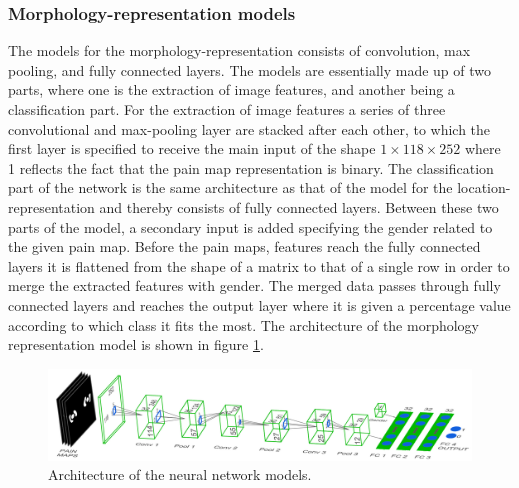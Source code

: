 


\subsubsection{Morphology-representation models}
The models for the morphology-representation consists of convolution, max pooling, and fully connected layers. 
The models are essentially made up of two parts, where one is the extraction of image features, and another being a classification part.
For the extraction of image features a series of three convolutional and max-pooling layer are stacked after each other, to which the first layer is specified to receive the main input of the shape $1 \times 118 \times 252$ where 1 reflects the fact that the pain map representation is binary.
The classification part of the network is the same architecture as that of the model for the location-representation and thereby consists of fully connected layers. Between these two parts of the model, a secondary input is added specifying the gender related to the given pain map.
Before the pain maps, features reach the fully connected layers it is flattened from the shape of a matrix to that of a single row in order to merge the extracted features with gender. The merged data passes through fully connected layers and reaches the output layer where it is given a percentage value according to which class it fits the most.
The architecture of the morphology representation model is shown in figure \ref{fig:Schema1}.

\begin{figure} [H]
\centering
\includegraphics[width=1.0\textwidth]{figures/models}
\caption{Architecture of the neural network models.}
\label{fig:Schema1}
\end{figure}


